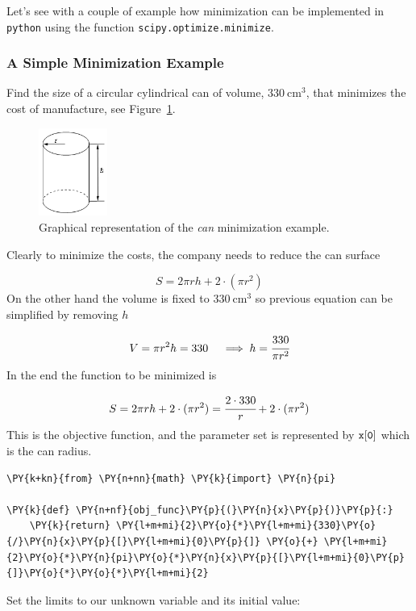 Let's see with a couple of example how minimization can be implemented in \texttt{python} using the function \texttt{scipy.optimize.minimize}.

\subsubsection{A Simple Minimization Example}
\label{example}

Find the size of a circular cylindrical can of volume, \(330~\mathrm{cm}^3\),
that minimizes the cost of manufacture, see Figure~\ref{fig:cylinder}.

\begin{figure}[h]
\centering
\includegraphics[width=0.2\textwidth]{figures/cylinder.png}
\caption{Graphical representation of the \emph{can} minimization example.}
\label{fig:cylinder}
\end{figure}

Clearly to minimize the costs, the company needs to reduce the can
surface

\begin{equation*} 
S = 2\pi rh + 2\cdot(\pi r^2) 
\end{equation*}
On the other hand the volume is fixed to \(330~\mathrm{cm}^3\) so previous
equation can be simplified by removing \(h\)

\begin{equation*} 
V = \pi r^2 h = 330\quad\implies h = \cfrac{330}{\pi r^2}
\end{equation*}
In the end the function to be minimized is

\begin{equation}
S = 2\pi rh + 2\cdot(\pi r^2) = \cfrac{2\cdot 330}{r} + 2\cdot(\pi r^2)
\end{equation}
This is the objective function, and the parameter set is represented 
by \(\tt{x[0]}\) which is the can radius.

\begin{codebox}
\begin{Verbatim}[commandchars=\\\{\}]
\PY{k+kn}{from} \PY{n+nn}{math} \PY{k}{import} \PY{n}{pi}

\PY{k}{def} \PY{n+nf}{obj_func}\PY{p}{(}\PY{n}{x}\PY{p}{)}\PY{p}{:}
    \PY{k}{return} \PY{l+m+mi}{2}\PY{o}{*}\PY{l+m+mi}{330}\PY{o}{/}\PY{n}{x}\PY{p}{[}\PY{l+m+mi}{0}\PY{p}{]} \PY{o}{+} \PY{l+m+mi}{2}\PY{o}{*}\PY{n}{pi}\PY{o}{*}\PY{n}{x}\PY{p}{[}\PY{l+m+mi}{0}\PY{p}{]}\PY{o}{*}\PY{o}{*}\PY{l+m+mi}{2}
\end{Verbatim}
\end{codebox}
\noindent
Set the limits to our unknown variable and its initial value:

